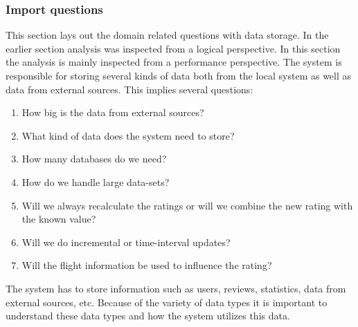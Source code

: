 \subsubsection{Import questions}
This section lays out the domain related questions with data storage. In the earlier section analysis was inspected from a logical perspective. In this section the analysis is mainly inspected from a performance perspective.
The system is responsible for storing several kinds of data both from the local system as well as data from external sources. This implies several questions:
\begin{enumerate}
\item How big is the data from external sources?
\item What kind of data does the system need to store?
\item How many databases do we need?
\item How do we handle large data-sets?
\item Will we always recalculate the ratings or will we combine the new rating with the known value?
\item Will we do incremental or time-interval updates?
\item Will the flight information be used to influence the rating?
\end{enumerate}
The system has to store information such as users, reviews, statistics, data from external sources, etc. Because of the variety of data types it is important to understand these data types and how the system utilizes this data.

